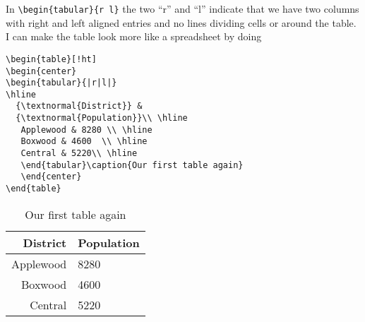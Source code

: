 In \verb|\begin{tabular}{r l}| the two ``r'' and ``l'' indicate that we have two columns with right and left aligned entries and no lines dividing cells or around the table. I can make the table look more like a spreadsheet by doing
\begin{singlespace}\small
\begin{verbatim}
\begin{table}[!ht]
\begin{center}
\begin{tabular}{|r|l|}
\hline
  {\textnormal{District}} &  
  {\textnormal{Population}}\\ \hline
   Applewood & 8280 \\ \hline
   Boxwood & 4600  \\ \hline
   Central & 5220\\ \hline
   \end{tabular}\caption{Our first table again}
   \end{center}
\end{table}
\end{verbatim}
\end{singlespace}
\begin{table}[!ht]
\begin{center}
\begin{tabular}{|r|l|}
\hline
  {\textnormal{District}} &  
  {\textnormal{Population}}\\ \hline
   Applewood & 8280 \\ \hline
   Boxwood & 4600  \\ \hline
   Central & 5220\\ \hline
   \end{tabular}\caption{Our first table again}
   \end{center}
\end{table}

